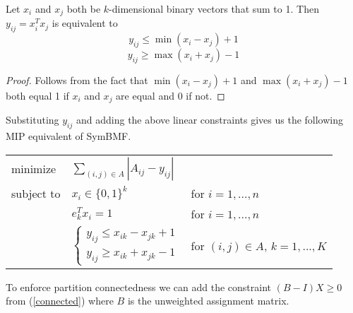 \begin{lemma}
Let $x_i$ and $x_j$ both be $k$-dimensional binary vectors that sum to 1.
Then $y_{ij} = x_i^T x_j$ is equivalent to
\[ y_{ij} \leq \min (x_i - x_j) + 1 \]
\[ y_{ij} \geq \max (x_i + x_j) - 1 \]

\end{lemma}

\begin{proof}
Follows from the fact that $\min (x_i - x_j) + 1$ and
$\max (x_i + x_j) - 1$ both equal 1 if $x_i$ and $x_j$ are equal
and 0 if not.
\end{proof}

Substituting $y_{ij}$ and adding the above linear constraints gives us
the following MIP equivalent of SymBMF.

\begin{center}
\begin{tabular}{l l l}
minimize   & $\sum_{(i,j) \in A} |A_{ij} - y_{ij}|$ \\
subject to & $x_i \in \{0, 1\}^k$ & for $i = 1, ..., n$ \\
           & $e_k^T x_i = 1$ & for $i = 1, ..., n$ \\
           & $\begin{cases}
             y_{ij} \leq x_{ik} - x_{jk} + 1 \\
             y_{ij} \geq x_{ik} + x_{jk} - 1
             \end{cases}$
           & for $(i,j) \in A$, $k = 1, ..., K$
\end{tabular}
\end{center}

To enforce partition connectedness we can add the constraint
$(B - I) X \geq 0$ from (\ref{connected}) where $B$ is the unweighted
assignment matrix.
